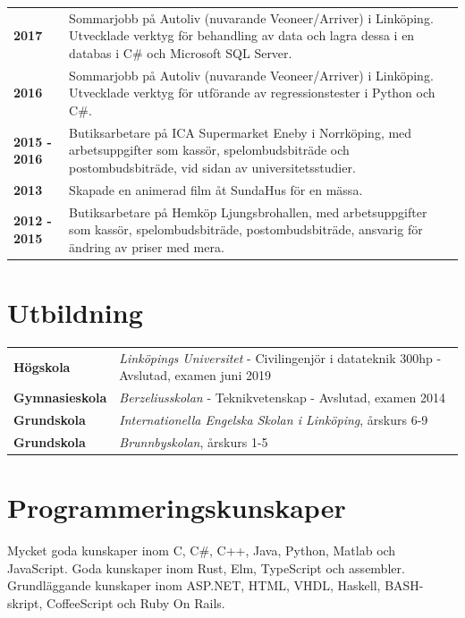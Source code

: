 \documentclass[a4paper,notitlepage]{article}
\begin{document}
\begin{longtable}{@{}l p{13cm}}
\textbf{2017} & Sommarjobb på Autoliv (nuvarande Veoneer/Arriver) i Linköping.
    Utvecklade verktyg för behandling av data och lagra dessa i en databas
    i C\# och Microsoft SQL Server. \\

\textbf{2016} & Sommarjobb på Autoliv (nuvarande Veoneer/Arriver) i Linköping.
    Utvecklade verktyg för utförande av regressionstester i Python och C\#.\\

\textbf{2015 - 2016} & Butiksarbetare på ICA Supermarket Eneby i Norrköping, med
arbetsuppgifter som kassör, spelombudsbiträde och postombudsbiträde, vid sidan
av universitetsstudier. \\

\textbf{2013} & Skapade en animerad film åt SundaHus för en mässa.
\\

\textbf{2012 - 2015} & Butiksarbetare på Hemköp Ljungsbrohallen,
med arbetsuppgifter
som kassör,
spelombudsbiträde, postombudsbiträde, ansvarig för ändring av priser med mera.
\\

\end{longtable}

\section*{Utbildning}
\begin{tabular}{@{}l p{11cm}}
	\textbf{Högskola} & \textit{Linköpings Universitet} - Civilingenjör i
	datateknik 300hp - Avslutad, examen juni 2019 \\

	\textbf{Gymnasieskola} & \textit{Berzeliusskolan} - Teknikvetenskap -
	Avslutad, examen 2014 \\

	\textbf{Grundskola} & \textit{Internationella Engelska Skolan i Linköping},
	årskurs 6-9 \\

	\textbf{Grundskola} & \textit{Brunnbyskolan}, årskurs 1-5 \\
\end{tabular}

\section*{Programmeringskunskaper}
Mycket goda kunskaper inom C, C\#, C++, Java, Python, Matlab och JavaScript.
Goda kunskaper inom Rust, Elm, TypeScript och assembler.
Grundläggande kunskaper inom ASP.NET, HTML, VHDL, Haskell, BASH-skript,
CoffeeScript och Ruby On Rails.
\end{document}
